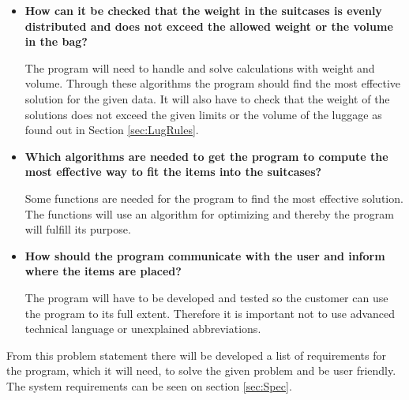 \begin{itemize}
\item \textbf{How can it be checked that the weight in the suitcases is evenly distributed and does not exceed the allowed weight or the volume in the bag?}

The program will need to handle and solve calculations with weight and volume. Through these algorithms the program should find the most effective solution for the given data. It will also have to check that the weight of the solutions does not exceed the given limits or the volume of the luggage as found out in Section \ref{sec:LugRules}.

\item \textbf{Which algorithms are needed to get the program to compute the most effective way to fit the items into the suitcases?}

Some functions are needed for the program to find the most effective solution. The functions will use an algorithm for optimizing and thereby the program will fulfill its purpose.

\item \textbf{How should the program communicate with the user and inform where the items are placed?}

The program will have to be developed and tested so the customer can use the program to its full extent. Therefore it is important not to use advanced technical language or unexplained abbreviations.
\end{itemize}

From this problem statement there will be developed a list of requirements for the program, which it will need, to solve the given problem and be user friendly. The system requirements can be seen on section \ref{sec:Spec}.
